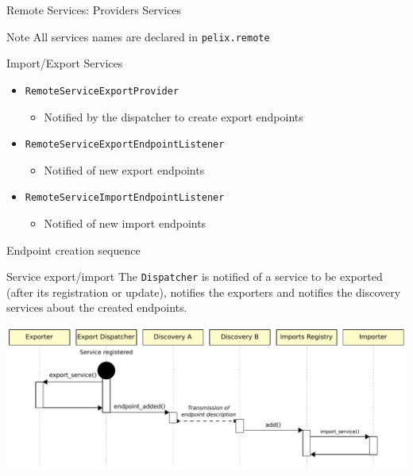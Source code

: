 \begin{frame}{Remote Services: Providers Services}
\begin{small}
\begin{exampleblock}{Note}
All services names are declared in \texttt{pelix.remote}
\end{exampleblock}

\begin{block}{Import/Export Services}
\begin{itemize}
\item[] \texttt{RemoteServiceExportProvider}
\begin{itemize}
\item[] Notified by the dispatcher to create export endpoints
\end{itemize}
\item[] \texttt{RemoteServiceExportEndpointListener}
\begin{itemize}
\item[] Notified of new export endpoints
\end{itemize}
\item[] \texttt{RemoteServiceImportEndpointListener}
\begin{itemize}
\item[] Notified of new import endpoints
\end{itemize}
\end{itemize}
\end{block}
\end{small}
\end{frame}

\begin{frame}{Endpoint creation sequence}
\begin{small}
\begin{block}{Service export/import}
The \texttt{Dispatcher} is notified of a service to be exported (after its registration or update), notifies the exporters and notifies the discovery services about the created endpoints.
\end{block}
\end{small}

\vspace{2ex}

\centering
\includegraphics[width=\textwidth]{../imgs/rs_sequence}
\end{frame}

